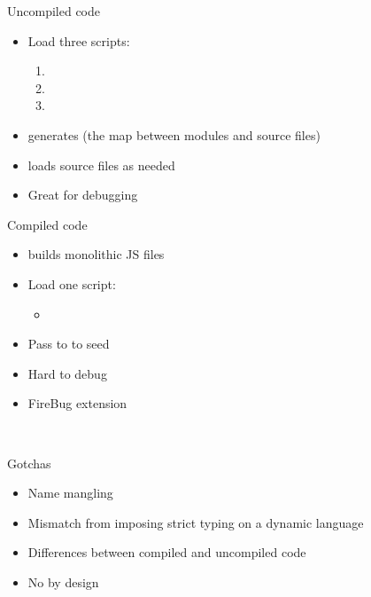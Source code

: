 \documentclass{powerdot}
\begin{document}
\begin{slide}{Uncompiled code}
\begin{itemize}
\item Load three scripts:
\begin{enumerate}
\item {}
\item {}
\item {}
\end{enumerate}
\item {} generates  (the map between modules and source files)
\item {} loads source files as needed
\item Great for debugging
\end{itemize}
\end{slide}

\begin{slide}{Compiled code}
\begin{itemize}
\item {} builds monolithic JS files
\item Load one script:
\begin{itemize}
\item {}
\end{itemize}
\item Pass  to  to seed
\item Hard to debug
\item FireBug extension
\end{itemize}
 \\
\end{slide}

\begin{slide}{Gotchas}
\begin{itemize}
\item Name mangling
\item Mismatch from imposing strict typing on a dynamic language
\item Differences between compiled and uncompiled code
\item No  by design
\end{itemize}
\end{slide}
\end{document}
